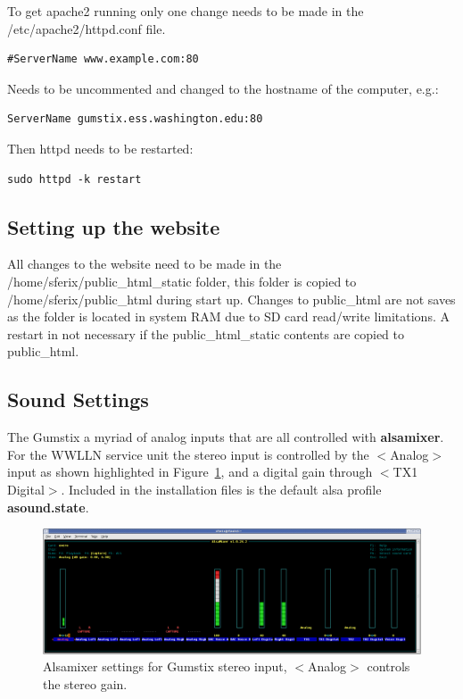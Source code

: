 \documentclass[12pt, letterpaper, onecolumn, oneside]{article}
\begin{document}
To get apache2 running only one change needs to be made in the /etc/apache2/httpd.conf file.

\begin{verbatim}
#ServerName www.example.com:80
\end{verbatim}

Needs to be uncommented and changed to the hostname of the computer, e.g.:

\begin{verbatim}
ServerName gumstix.ess.washington.edu:80
\end{verbatim}

Then httpd needs to be restarted:

\begin{verbatim}
sudo httpd -k restart
\end{verbatim}

\subsection*{Setting up the website}

All changes to the website need to be made in the /home/sferix/public\_html\_static folder, this folder is copied to /home/sferix/public\_html during start up. Changes to public\_html are not saves as the folder is located in system RAM due to SD card read/write limitations. A restart in not necessary if the public\_html\_static contents are copied to public\_html.

\subsection{Sound Settings}

The Gumstix a myriad of analog inputs that are all controlled with {\bf alsamixer}.
For the WWLLN service unit the stereo input is controlled by the $<$Analog$>$ input as shown highlighted in Figure~\ref{app:gumstix:fig:alsa}, and a digital gain through $<$TX1 Digital$>$.
Included in the installation files is the default alsa profile {\bf asound.state}.

\begin{figure}[ht!]
   \centering
   \includegraphics[scale=.3]{Figures/gumstixmixer.png}
   \caption{Alsamixer settings for Gumstix stereo input, $<$Analog$>$ controls the stereo gain.}
   \label{app:gumstix:fig:alsa}
\end{figure}
\end{document}
